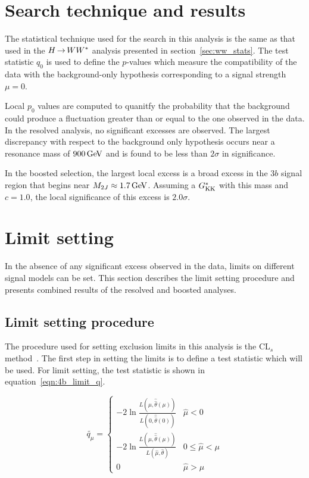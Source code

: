 \section{Search technique and results}

The statistical technique used for the search in this analysis is the same as that used in the $H{\,{\rightarrow}\,}WW^\ast$ analysis presented in section~\ref{sec:ww_stats}. The test statistic $q_0$ is used to define the $p$-values which measure the compatibility of the data with the background-only hypothesis corresponding to a signal strength $\mu = 0$. 

Local $p_0$ values are computed to quanitfy the probability that the background could produce a fluctuation greater than or equal to the one observed in the data. In the resolved analysis, no significant excesses are observed. The largest discrepancy with respect to the background only hypothesis occurs near a resonance mass of $900 \GeV$ and is found to be less than $2\sigma$ in significance.

In the boosted selection, the largest local excess is a broad excess in the $3b$ signal region that begins near $M_{2J} \approx 1.7 \GeV$. Assuming a $G^*_{\rm KK}$ with this mass and $c=1.0$, the local significance of this excess is $2.0 \sigma$. 

\section{Limit setting}

In the absence of any significant excess observed in the data, limits on different signal models can be set. This section describes the limit setting procedure and presents combined results of the resolved and boosted analyses. 

\subsection{Limit setting procedure}

The procedure used for setting exclusion limits in this analysis is the CL$_{s}$ method~\cite{CLS}. The first step in setting the limits is to define a test statistic which will be used. For limit setting, the test statistic is shown in equation~\ref{eqn:4b_limit_q}. 

\begin{equation}
\label{eqn:4b_limit_q}
  \widetilde{q_{\mu}} =
  \begin{cases}
    -2\ln \frac{L(\mu,\hat{\hat{\theta}}(\mu))}{L(0,\hat{\hat{\theta}}(0))} & \hat{\mu} < 0 \\
    -2\ln \frac{L(\mu,\hat{\hat{\theta}}(\mu))}{L(\hat{\mu},\hat{\theta})} & 0 \le \hat{\mu} < \mu \\
    0 & \hat{\mu} > \mu
  \end{cases} 
\end{equation}

